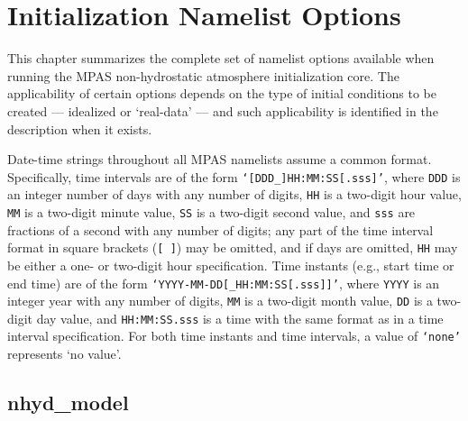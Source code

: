 \chapter{Initialization Namelist Options}
\label{chap:init_atm_namelist}

\def\bsq#1{\lq{#1}\rq}This chapter summarizes the complete set of namelist options available when running the MPAS non-hydrostatic atmosphere initialization core.  The applicability of certain options depends on the type of initial conditions to be created --- idealized or \bsq{real-data} --- and such applicability is identified in the description when it exists.

 Date-time strings throughout all MPAS namelists assume a common format. Specifically, time intervals are of the form {\tt \bsq{[DDD\_]HH:MM:SS[.sss]}}, where {\tt DDD} is an integer number of days with any number of digits, {\tt HH} is a two-digit hour value, {\tt MM} is a two-digit minute value, {\tt SS} is a two-digit second value, and {\tt sss} are fractions of a second with any number of digits; any part of the time interval format in square brackets ({\tt [ ]}) may be omitted, and if days are omitted, {\tt HH} may be either a one- or two-digit hour specification.  Time instants (e.g., start time or end time) are of the form {\tt \bsq{YYYY-MM-DD[\_HH:MM:SS[.sss]]}}, where {\tt YYYY} is an integer year with any number of digits, {\tt MM} is a two-digit month value, {\tt DD} is a two-digit day value, and {\tt HH:MM:SS.sss} is a time with the same format as in a time interval specification. For both time instants and time intervals, a value of {\tt \bsq{none}} represents \bsq{no value}.

\renewcommand{\arraystretch}{1.5}
\hypertarget{irec:nhyd_model}{}
\section{nhyd\_model}
\small

